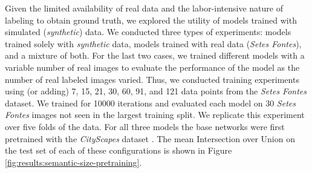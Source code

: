 Given the limited availability of real data and the labor-intensive nature of labeling to obtain ground truth, we explored the utility of models trained with simulated (\textit{synthetic}) data. We conducted three types of experiments: models trained solely with \textit{synthetic} data, models trained with real data (\textit{Setes Fontes}), and a mixture of both. For the last two cases, we trained different models with a variable number of real images to evaluate the performance of the model as the number of real labeled images varied. Thus, we conducted training experiments using (or adding) 7, 15, 21, 30, 60, 91, and 121 data points from the \textit{Setes Fontes} dataset. We trained for 10000 iterations and evaluated each model on 30 \textit{Setes Fontes} images not seen in the largest training split. We replicate this experiment over five folds of the data. For all three models the base networks were first pretrained with the \textit{CityScapes} dataset \cite{Cordts2016}. The mean Intersection over Union on the test set of each of these configurations is shown in Figure \ref{fig:results:semantic-size-pretraining}.

